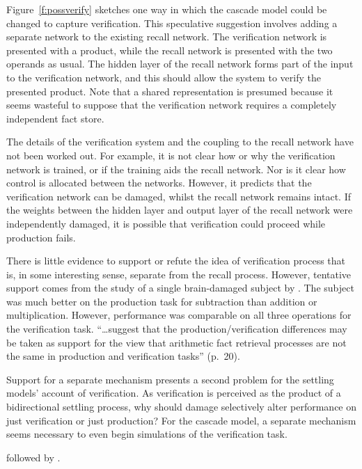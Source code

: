 Figure~\ref{f:possverify} sketches one way in which the cascade model could
be changed to capture verification.  This speculative suggestion
involves adding a separate network to the existing recall network.
The verification network is presented with a product, while the recall
network is presented with the two operands as usual. The hidden layer of
the
recall network forms part of the input to the verification network, and
this should
allow the system to verify the presented product.  Note that a shared
representation is presumed because it seems wasteful to suppose that the
verification network requires a completely independent fact store.

The details of the verification system and the coupling to the recall
network have not been worked out.  For example, it is not clear how or why
the verification network is trained, or if the training aids the recall
network.  Nor is it clear how control is allocated between the networks.
However, it predicts that the verification network can be damaged, whilst
the recall network remains intact. If the weights between the hidden layer
and output layer of the recall network were independently damaged, it is
possible that verification could proceed while production fails.

There is little evidence to support or refute the idea of verification
process that is, in some interesting sense, separate from the recall
process. However, tentative support comes from the study of a single
brain-damaged subject by . The subject was much better on
the production task for subtraction than addition or multiplication.
However, performance was comparable on all three operations for the
verification task. \citeauthor{dageorga} ``\ldots suggest that the
production/verification differences may be taken as support for the view
that arithmetic fact retrieval processes are not the same in production and
verification tasks'' (p.~20).

Support for a separate mechanism presents a second problem for the settling
models' account of verification.  As verification is perceived as the
product of a bidirectional settling process, why should damage selectively
alter performance on just verification or just production? For the cascade
model, a separate mechanism seems necessary to even begin simulations of
the verification task.


\begin{fancyfigure}
\centerline{}
\caption{ followed by .}
\label{f:chain1}
\end{fancyfigure}

